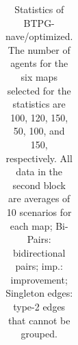 \documentclass[letterpaper]{article} %
\theoremstyle{definition}
\begin{document}
\begin{table}[th!]
{\begin{tabular}{|c|c|c|c|c|c|c|c|c|c|c|c|c|}
   
    \end{tabular}}
    
   \caption{Statistics of BTPG-nave/optimized. The number of agents for the six maps selected for the statistics are 100, 120, 150, 50, 100, and 150, respectively. All data in the second block are averages of 10 scenarios for each map; Bi-Pairs: bidirectional pairs; imp.: improvement; Singleton edges: type-2 edges that cannot be grouped. %
   }
   \label{tab:Statistics of BTPG-naive}
 \end{table}
\end{document}
